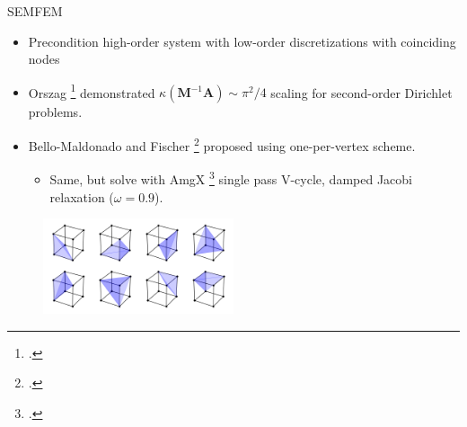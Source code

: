 \begin{frame}{SEMFEM}
  \begin{itemize}
    \item Precondition high-order system with low-order discretizations with coinciding nodes
    \item Orszag \footcite{parter_spectral_1979} demonstrated $\kappa(\mathbf M^{-1} \mathbf A) \sim \pi^2/4$ scaling for second-order Dirichlet problems.
    \item Bello-Maldonado and Fischer \footcite{bello-maldonado_scalable_2019} proposed using one-per-vertex scheme.
    \begin{itemize}
      \item{
        Same, but solve with AmgX \footcite{naumov_amgx_2015}
        single pass V-cycle, damped Jacobi relaxation ($\omega = 0.9$).
        }
    \end{itemize}
  \end{itemize}
  \vspace{-0.35cm}
  \begin{figure}
    \includegraphics[width=0.5\textwidth]{../figs/one-tet-per-vertex.png}
  \end{figure}
\end{frame}